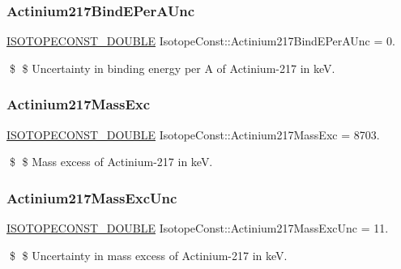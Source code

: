 \subsubsection{\texorpdfstring{Actinium217\+Bind\+E\+Per\+A\+Unc}{Actinium217BindEPerAUnc}}
{\footnotesize\ttfamily \mbox{\hyperlink{group___isotope_const-_macros_ga8f45a7272ce02c0b4c65c44636ed719a}{I\+S\+O\+T\+O\+P\+E\+C\+O\+N\+S\+T\+\_\+\+D\+O\+U\+B\+LE}} Isotope\+Const\+::\+Actinium217\+Bind\+E\+Per\+A\+Unc = 0.}

\$ \$ Uncertainty in binding energy per A of Actinium-\/217 in keV. \mbox{\label{group___isotope_const-_actinium-_ac217_ga0fed33436ca1507c7745237a013d72b6}} 
\subsubsection{\texorpdfstring{Actinium217\+Mass\+Exc}{Actinium217MassExc}}
{\footnotesize\ttfamily \mbox{\hyperlink{group___isotope_const-_macros_ga8f45a7272ce02c0b4c65c44636ed719a}{I\+S\+O\+T\+O\+P\+E\+C\+O\+N\+S\+T\+\_\+\+D\+O\+U\+B\+LE}} Isotope\+Const\+::\+Actinium217\+Mass\+Exc = 8703.}

\$ \$ Mass excess of Actinium-\/217 in keV. \mbox{\label{group___isotope_const-_actinium-_ac217_gac51de704589221f76ec081cd29072513}} 
\subsubsection{\texorpdfstring{Actinium217\+Mass\+Exc\+Unc}{Actinium217MassExcUnc}}
{\footnotesize\ttfamily \mbox{\hyperlink{group___isotope_const-_macros_ga8f45a7272ce02c0b4c65c44636ed719a}{I\+S\+O\+T\+O\+P\+E\+C\+O\+N\+S\+T\+\_\+\+D\+O\+U\+B\+LE}} Isotope\+Const\+::\+Actinium217\+Mass\+Exc\+Unc = 11.}

\$ \$ Uncertainty in mass excess of Actinium-\/217 in keV. \mbox{\label{group___isotope_const-_actinium-_ac217_ga6194852b9ce43e8ef6b7cd1f2708b70a}} 
